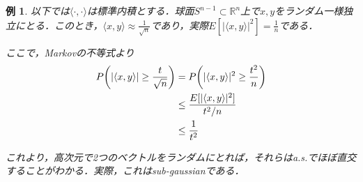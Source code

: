 \documentclass{ltjsarticle}
\theoremstyle{mystyle1}
\theoremstyle{mystyle2}
\newtheorem{example}{例}
\theoremstyle{mystyle3}
\begin{document}
\begin{example}
    以下では$\langle\cdot,\cdot\rangle$は標準内積とする．球面$S^{n-1}\subset\mathbb{R}^n$上で$x,y$をランダム一様独立にとる．このとき，$\langle x,y\rangle\approx\frac{1}{\sqrt{n}}$であり，実際$E[|\langle x,y\rangle|^2]=\frac{1}{n}$である．

    ここで，Markovの不等式より
    \begin{equation}
        \begin{split}
            P\mleft(|\langle x,y\rangle|\geq \frac{t}{\sqrt{n}}\mright)&=P\mleft(|\langle x,y\rangle|^2\geq \frac{t^2}{n}\mright) \\
            &\leq \frac{E[|\langle x,y\rangle|^2]}{t^2/n}\\
            &\leq\frac{1}{t^2}
        \end{split}
    \end{equation}

    これより，高次元で2つのベクトルをランダムにとれば，それらはa.s.でほぼ直交することがわかる．実際，これはsub-gaussianである．
\end{example}
\end{document}
